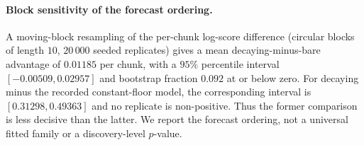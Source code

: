 \paragraph{Block sensitivity of the forecast ordering.}
A moving-block resampling of the per-chunk log-score difference (circular
blocks of length $10$, $20\,000$ seeded replicates) gives a mean
decaying-minus-bare advantage of $0.01185$ per chunk, with a $95\%$ percentile interval
$[-0.00509,0.02957]$ and bootstrap fraction $0.092$ at or below zero.  For
decaying minus the recorded constant-floor model, the corresponding interval is
$[0.31298,0.49363]$ and no replicate is non-positive.  Thus the former
comparison is less decisive than the latter.  We report the forecast ordering,
not a universal fitted family or a discovery-level $p$-value.
